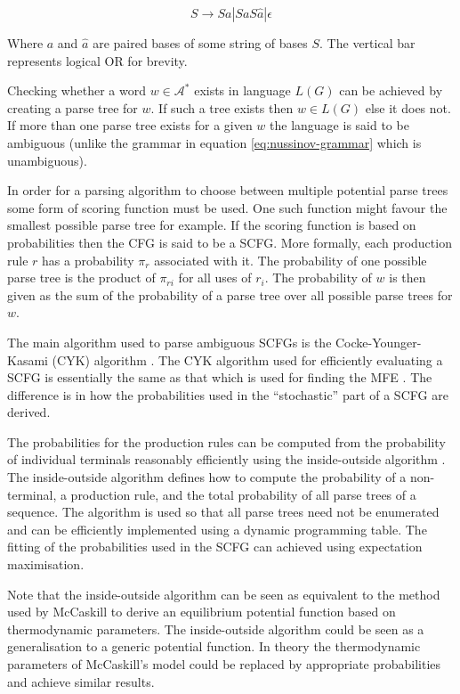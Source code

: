 \documentclass[journal]{IEEEtran}
\begin{document}
\begin{equation}
	\label{eq:nussinov-grammar}
	S \rightarrow S a | S a S \hat{a} | \epsilon
\end{equation} 

Where $a$ and $\hat{a}$ are paired bases of some string of bases $S$. The vertical bar represents logical OR for brevity.

Checking whether a word $w \in \mathcal{A}^*$ exists in language $L(G)$ can be achieved by creating a parse tree for $w$. If such a tree exists then $w \in L(G)$ else it does not. If more than one parse tree exists for a given $w$ the language is said to be ambiguous (unlike the grammar in equation \ref{eq:nussinov-grammar} which is unambiguous).

In order for a parsing algorithm to choose between multiple potential parse trees some form of scoring function must be used. One such function might favour the smallest possible parse tree for example. If the scoring function is based on probabilities then the CFG is said to be a SCFG. More formally, each production rule $r$ has a probability $\pi_r$ associated with it. The probability of one possible parse tree is the product of $\pi_{ri}$ for all uses of $r_i$. The probability of $w$ is then given as the sum of the probability of a parse tree over all possible parse trees for $w$.

The main algorithm used to parse ambiguous SCFGs is the Cocke-Younger-Kasami (CYK) algorithm \cite{giegerich2014introduction, cocke1969programming, younger1967recognition, kasami1965efficient} . The CYK algorithm used for efficiently evaluating a SCFG is essentially the same as that which is used for finding the MFE \cite{zuker1981optimal}. The difference is in how the probabilities used in the ``stochastic'' part of a SCFG are derived.

The probabilities for the production rules can be computed from the probability of individual terminals reasonably efficiently using the inside-outside algorithm \cite{lari1990estimation}. The inside-outside algorithm defines how to compute the probability of a non-terminal, a production rule, and the total probability of all parse trees of a sequence. The algorithm is used so that all parse trees need not be enumerated and can be efficiently implemented using a dynamic programming table. The fitting of the probabilities used in the SCFG can achieved using expectation maximisation. 

Note that the inside-outside algorithm can be seen as equivalent to the method used by McCaskill \cite{mccaskill1990equilibrium} to derive an equilibrium potential function based on thermodynamic parameters. The inside-outside algorithm could be seen as a generalisation to a generic potential function. In theory the thermodynamic parameters of McCaskill's model could be replaced by appropriate probabilities and achieve similar results.
\end{document}
